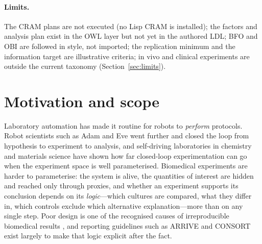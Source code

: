 \documentclass[10pt,a4paper]{article}
\begin{document}
\paragraph{Limits.} The CRAM plans are not executed (no Lisp CRAM is installed); the factors and analysis plan exist
in the OWL layer but not yet in the authored LDL; BFO and OBI are followed in style, not imported; the replication
minimum and the information target are illustrative criteria; in vivo and clinical experiments are outside the
current taxonomy (Section~\ref{sec:limits}).


\section{Motivation and scope}\label{sec:motivation}
Laboratory automation has made it routine for robots to \emph{perform} protocols. Robot scientists such as Adam and
Eve \citep{king2009,williams2015} went further and closed the loop from hypothesis to experiment to analysis, and
self-driving laboratories in chemistry and materials science \citep{burger2020,abolhasani2023} have shown how far
closed-loop experimentation can go when the experiment space is well parameterised. Biomedical experiments are
harder to parameterise: the system is alive, the quantities of interest are hidden and reached only through proxies,
and whether an experiment supports its conclusion depends on its \emph{logic}---which cultures are compared, what
they differ in, which controls exclude which alternative explanation---more than on any single step. Poor design is
one of the recognised causes of irreproducible biomedical results \citep{baker2016}, and reporting guidelines such
as ARRIVE \citep{kilkenny2010} and CONSORT \citep{schulz2010} exist largely to make that logic explicit after the
fact.
\end{document}
